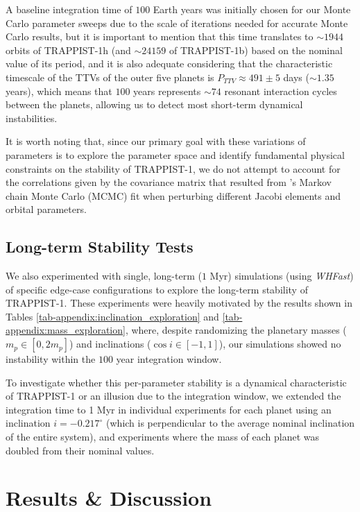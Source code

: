 \documentclass{aa}
\begin{document}
A baseline integration time of $100$ Earth years was initially chosen for our Monte Carlo parameter sweeps due to the scale of iterations needed for accurate Monte Carlo results, but it is important to mention that this time translates to $\sim1944$ orbits of TRAPPIST-1h (and $\sim24159$ of TRAPPIST-1b) based on the nominal value of its period, and it is also adequate considering that the characteristic timescale of the TTVs of the outer five planets \citep{2021PSJ.....2....1A} is $P_{TTV}\approx491\pm5$ days ($\sim1.35$ years), which means that $100$ years represents $\sim74$ resonant interaction cycles between the planets, allowing us to detect most short-term dynamical instabilities.

It is worth noting that, since our primary goal with these variations of parameters is to explore the parameter space and identify fundamental physical constraints on the stability of TRAPPIST-1, we do not attempt to account for the correlations given by the covariance matrix that resulted from \cite{2021PSJ.....2....1A}'s Markov chain Monte Carlo (MCMC) fit when perturbing different Jacobi elements and orbital parameters.

\subsection{Long-term Stability Tests}

We also experimented with single, long-term ($1$ Myr) simulations (using \textit{WHFast}) of specific edge-case configurations to explore the long-term stability of TRAPPIST-1. These experiments were heavily motivated by the results shown in Tables \ref{tab-appendix:inclination_exploration} and \ref{tab-appendix:mass_exploration}, where, despite randomizing the planetary masses ($m_p \in [0, 2m_p]$) and inclinations ($\cos i \in [-1,1]$), our simulations showed no instability within the $100$ year integration window.

To investigate whether this per-parameter stability is a dynamical characteristic of TRAPPIST-1 or an illusion due to the integration window, we extended the integration time to 1 Myr in individual experiments for each planet using an inclination $i=-0.217^\circ$ (which is perpendicular to the average nominal inclination of the entire system), and experiments where the mass of each planet was doubled from their nominal values.


\section{Results \& Discussion}
\label{sec:results}
\end{document}
